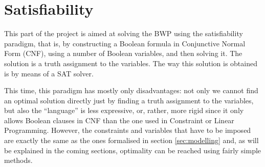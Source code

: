 \section{Satisfiability}
\label{sec:satisfiability}

This part of the project is aimed at solving the BWP using the satisfiability
paradigm, that is, by constructing a Boolean formula in Conjunctive Normal Form
(CNF), using a number of Boolean variables, and then solving it. The solution
is a truth assignment to the variables. The way this solution is obtained is
by means of a SAT solver.

\hfill

This time, this paradigm has mostly only disadvantages: not only we cannot find
an optimal solution directly just by finding a truth assignment to the variables,
but also the ``language'' is less expressive, or, rather, more rigid since it
only allows Boolean clauses in CNF than the one used in Constraint or Linear
Programming. However, the constraints and variables that have to be imposed
are exactly the same as the ones formalised in section \ref{sec:modelling} and,
as will be explained in the coming sections, optimality can be reached using
fairly simple methods.

\hfill

